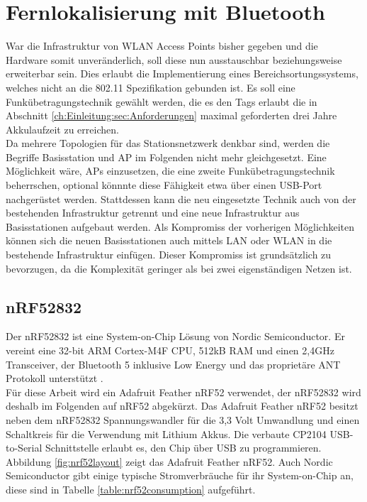 \chapter{Fernlokalisierung mit Bluetooth}
\label{ch:phase3}
War die Infrastruktur von WLAN Access Points bisher gegeben und die Hardware somit unveränderlich, soll diese nun ausstauschbar beziehungsweise erweiterbar sein.
Dies erlaubt die Implementierung eines Bereichsortungssystems, welches nicht an die 802.11 Spezifikation gebunden ist.
Es soll eine Funkübetragungstechnik gewählt werden, die es den Tags erlaubt die in Abschnitt \ref{ch:Einleitung:sec:Anforderungen} maximal geforderten drei Jahre Akkulaufzeit zu erreichen.\\
Da mehrere Topologien für das Stationsnetzwerk denkbar sind, werden die Begriffe Basisstation und AP im Folgenden nicht mehr gleichgesetzt.
Eine Möglichkeit wäre, APs einzusetzen, die eine zweite Funkübetragungstechnik beherrschen, optional könnnte diese Fähigkeit etwa über einen USB-Port nachgerüstet werden.
Stattdessen kann die neu eingesetzte Technik auch von der bestehenden Infrastruktur getrennt und eine neue Infrastruktur aus Basisstationen aufgebaut werden.
Als Kompromiss der vorherigen Möglichkeiten können sich die neuen Basisstationen auch mittels LAN oder WLAN in die bestehende Infrastruktur einfügen. 
Dieser Kompromiss ist grundsätzlich zu bevorzugen, da die Komplexität geringer als bei zwei eigenständigen Netzen ist.

\section{nRF52832}
Der nRF52832 ist eine System-on-Chip Lösung von Nordic Semiconductor.
Er vereint eine 32-bit ARM Cortex-M4F CPU, 512kB RAM und einen 2,4GHz Transceiver, der Bluetooth 5 inklusive Low Energy und das proprietäre ANT Protokoll unterstützt \cite{nordic2017nrf}.\\
Für diese Arbeit wird ein Adafruit Feather nRF52 verwendet, der nRF52832 wird deshalb im Folgenden auf nRF52 abgekürzt.
Das Adafruit Feather nRF52 besitzt neben dem nRF52832 Spannungswandler für die 3,3 Volt Umwandlung und einen Schaltkreis für die Verwendung mit Lithium Akkus. Die verbaute CP2104 USB-to-Serial Schnittstelle erlaubt es, den Chip über USB zu programmieren.\\
Abbildung \ref{fig:nrf52layout} zeigt das Adafruit Feather nRF52.
Auch Nordic Semiconductor gibt einige typische Stromverbräuche für ihr System-on-Chip an, diese sind in Tabelle \ref{table:nrf52consumption} aufgeführt.

